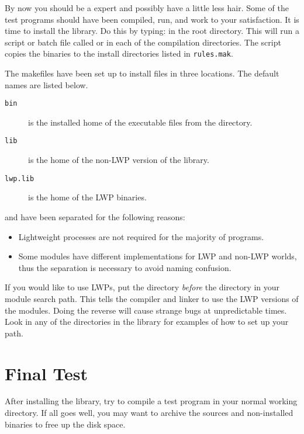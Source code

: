 By now you should be a  expert and possibly have a little
less hair.  Some of the test programs should have been compiled,
run, and work to your satisfaction.  It is time to install the library.
Do this by typing:  in the root directory.  This will run a
script or batch file called  or  in each
of the compilation directories.  The script copies the binaries to the 
install directories listed in {\tt rules.mak}.

The makefiles have been set up to install files in three locations.
The default names are listed below.

\begin{description}
\item[{\tt bin}] is the installed home of the executable files from 
	the  directory.
	
\item[{\tt lib}] is the home of the non-LWP version of the library.

\item[{\tt lwp.lib}] is the home of the LWP binaries.

\end{description}

 and  have been separated for the following reasons:
\begin{itemize}
\item
    Lightweight processes are not required for the majority of programs.
\item
    Some modules have different implementations for LWP and non-LWP
    worlds, thus the separation is necessary to avoid naming confusion.
\end{itemize}

If you would like to use LWPs, put the  directory {\em before}
the  directory in your module search path.  
This tells the compiler and linker to use the LWP versions
of the modules.  Doing the reverse will cause strange bugs at unpredictable
times.  Look in any of the  directories in the library for
examples of how to set up your path.

\section{Final Test}

After installing the library, try to compile a test program
in your normal working directory.
If all goes well, you may want to archive
the sources and non-installed binaries to free up the disk space.



